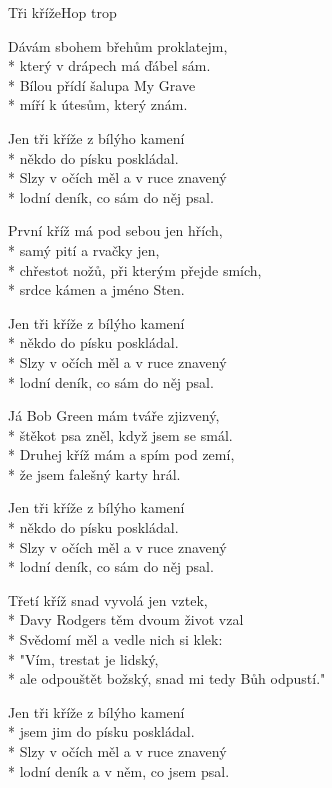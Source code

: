 \documentclass[10.5pt]{book}
\begin{document}
\begin{poem}{Tři kříže}{Hop trop}

\settowidth{\versewidth}{ale odpouštět božský, snad mi tedy Bůh odpustí."}

Dávám sbohem břehům proklatejm,\\*
který v drápech má ďábel sám.\\*
Bílou přídí šalupa My Grave\\*
míří k útesům, který znám.

Jen tři kříže z bílýho kamení\\*
někdo do písku poskládal.\\*
Slzy v očích měl a v ruce znavený\\*
lodní deník, co sám do něj psal.

První kříž má pod sebou jen hřích,\\*
samý pití a rvačky jen,\\*
chřestot nožů, při kterým přejde smích,\\*
srdce kámen a jméno Sten.

Jen tři kříže z bílýho kamení\\*
někdo do písku poskládal.\\*
Slzy v očích měl a v ruce znavený\\*
lodní deník, co sám do něj psal.

Já Bob Green mám tváře zjizvený,\\*
štěkot psa zněl, když jsem se smál.\\*
Druhej kříž mám a spím pod zemí,\\*
že jsem falešný karty hrál.

Jen tři kříže z bílýho kamení\\*
někdo do písku poskládal.\\*
Slzy v očích měl a v ruce znavený\\*
lodní deník, co sám do něj psal.

Třetí kříž snad vyvolá jen vztek,\\*
Davy Rodgers těm dvoum život vzal\\*
Svědomí měl a vedle nich si klek:\\*
"Vím, trestat je lidský,\\*
ale odpouštět božský, snad mi tedy Bůh odpustí."

Jen tři kříže z bílýho kamení\\*
jsem jim do písku poskládal.\\*
Slzy v očích měl a v ruce znavený\\*
lodní deník a v něm, co jsem psal.

\end{poem}
\end{document}
